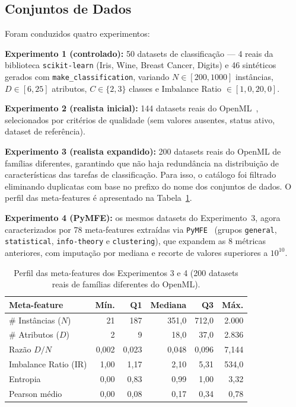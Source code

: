 \documentclass[12pt]{article}
\begin{document}
\subsection{Conjuntos de Dados}

Foram conduzidos quatro experimentos:

\textbf{Experimento 1 (controlado):} 50 datasets de classificação --- 4 reais da biblioteca \texttt{scikit-learn} (Iris, Wine, Breast Cancer, Digits) e 46 sintéticos gerados com \texttt{make\_classification}, variando $N \in [200, 1000]$ instâncias, $D \in [6, 25]$ atributos, $C \in \{2, 3\}$ classes e Imbalance Ratio $\in [1{,}0, 20{,}0]$.

\textbf{Experimento 2 (realista inicial):} 144 datasets reais do OpenML~\cite{vanschoren2014openml}, selecionados por critérios de qualidade (sem valores ausentes, status ativo, dataset de referência).

\textbf{Experimento 3 (realista expandido):} 200 datasets reais do OpenML de famílias diferentes, garantindo que não haja redundância na distribuição de características das tarefas de classificação. Para isso, o catálogo foi filtrado eliminando duplicatas com base no prefixo do nome dos conjuntos de dados. O perfil das meta-features é apresentado na Tabela~\ref{tab:metadataset_profile}.

\textbf{Experimento 4 (PyMFE):} os mesmos datasets do Experimento~3, agora caracterizados por 78 meta-features extraídas via \texttt{PyMFE}~\cite{pymfe2020} (grupos \texttt{general}, \texttt{statistical}, \texttt{info-theory} e \texttt{clustering}), que expandem as 8 métricas anteriores, com imputação por mediana e recorte de valores superiores a $10^{10}$.

\begin{table}[ht]
\centering
\caption{Perfil das meta-features dos Experimentos 3 e 4 (200 datasets reais de famílias diferentes do OpenML).}
\label{tab:metadataset_profile}
\small
\begin{tabular}{lrrrrr}
\toprule
\textbf{Meta-feature} & \textbf{Mín.} & \textbf{Q1} & \textbf{Mediana} & \textbf{Q3} & \textbf{Máx.} \\
\midrule
\# Instâncias ($N$)   & 21    & 187    & 351,0   & 712,0    & 2.000 \\
\# Atributos ($D$)    & 2     & 9      & 18,0    & 37,0     & 2.836 \\
Razão $D/N$          & 0,002 & 0,023  & 0,048   & 0,096    & 7,144 \\
Imbalance Ratio (IR)  & 1,00  & 1,17   & 2,10    & 5,31     & 534,0 \\
Entropia              & 0,00  & 0,83   & 0,99    & 1,00     & 3,32  \\
Pearson médio         & 0,00  & 0,08   & 0,17    & 0,34     & 0,78  \\
\bottomrule
\end{tabular}
\end{table}
\end{document}
